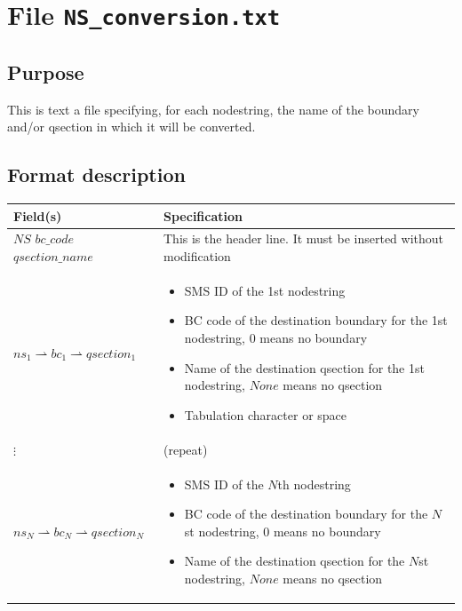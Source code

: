 \section{File \texttt{NS\_conversion.txt}}
\subsection{Purpose}
This is text a file specifying, for each nodestring, the name of the boundary and/or qsection in which it will be converted.

\subsection{Format description}
\begin{footnotesize}
\begin{tabular}{p{4cm} | p{10cm} }
\hline
Field(s) & Specification \\
\hline
\hline
$NS$    $bc\_code$   $qsection\_name$ & This is the header line. It must be inserted without modification \\
\hline
$ns_1 \rightharpoonup bc_1 \rightharpoonup qsection_1$ &
\begin{itemize}
\item [$ns_1$] SMS ID of the 1st nodestring
\item [$bc_1$] BC code of the destination boundary for the 1st nodestring, $0$ means no boundary
\item [$qsection_1$] Name of the destination qsection for the 1st nodestring, $None$ means no qsection
\item [$\rightharpoonup$] Tabulation character or space
\end{itemize} \\
\hline
$\vdots$ & (repeat) \\
\hline
$ns_N \rightharpoonup bc_N \rightharpoonup qsection_N$ &
\begin{itemize}
\item [$ns_N$] SMS ID of the $N$th nodestring
\item [$bc_N$] BC code of the destination boundary for the $N$st nodestring, $0$ means no boundary
\item [$qsection_N$] Name of the destination qsection for the $N$st nodestring, $None$ means no qsection
\end{itemize} \\
\hline
\end{tabular}
\end{footnotesize}

